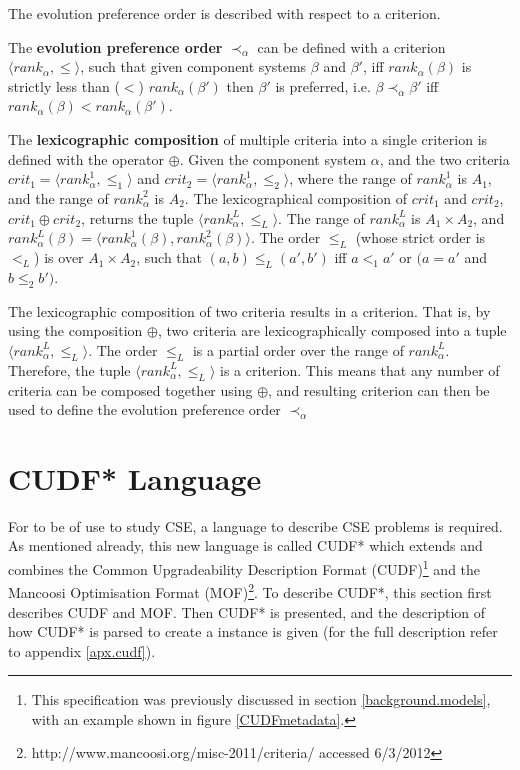 The evolution preference order is described with respect to a criterion.
\begin{defs}
\label{formal.defcrittooptimal}
The \textbf{evolution preference order} $\prec_{\alpha}$ can be defined with a criterion $\langle rank_{\alpha}, \leq \rangle$,
such that given component systems $\beta$ and $\beta'$, iff $rank_{\alpha}(\beta)$ is strictly less than ($<$) $rank_{\alpha}(\beta')$ then $\beta'$ is preferred, 
i.e. $\beta \prec_{\alpha} \beta'$ iff $rank_{\alpha}(\beta) < rank_{\alpha}(\beta')$.
\end{defs}


\begin{defs}
\label{formal.defcritlex}
The \textbf{lexicographic composition} of multiple criteria into a single criterion is defined with the operator $\oplus$.
Given the component system $\alpha$, and the two criteria $crit_1 = \langle rank^1_{\alpha}, \leq_{1} \rangle$ and $crit_2 = \langle rank^1_{\alpha}, \leq_{2} \rangle$,
where the range of $rank^1_{\alpha}$ is $A_1$, and the range of $rank^2_{\alpha}$ is $A_2$.
The lexicographical composition of $crit_1$ and $crit_2$, $crit_1 \oplus crit_2$, returns the tuple $\langle rank^L_{\alpha},\leq_L \rangle$.
The range of $rank^L_{\alpha}$ is $A_1 \times A_2$, and $rank^L_{\alpha}(\beta) = \langle rank^1_{\alpha}(\beta),rank^2_{\alpha}(\beta) \rangle$.
The order $\leq_L$ (whose strict order is $<_L$) is over $A_1 \times A_2$, such that $(a,b) \leq_L (a',b')$ iff $a <_1 a'$ or $(a = a'$ and $b \leq_2 b')$.
\end{defs}

The lexicographic composition of two criteria results in a criterion.
That is, by using the composition $\oplus$, two criteria are lexicographically composed into a tuple $\langle rank^L_{\alpha},\leq_L \rangle$.
The order $\leq_L$ is a partial order over the range of $rank^L_{\alpha}$.
Therefore, the tuple  $\langle rank^L_{\alpha},\leq_L \rangle$ is a criterion.
This means that any number of criteria can be composed together using $\oplus$,
and resulting criterion can then be used to define the evolution preference order $\prec_{\alpha}$


\section{CUDF* Language}
\label{formal.cudf}
For \modelname to be of use to study CSE, a language to describe CSE problems is required.
As mentioned already, this new language is called CUDF* which extends and combines the Common Upgradeability Description Format (CUDF)\footnote{This specification was previously discussed in section \ref{background.models}, with an example shown in figure \ref{CUDFmetadata}.
}
\citep{treinen2009common} and the Mancoosi Optimisation Format (MOF)\footnote{http://www.mancoosi.org/misc-2011/criteria/ accessed 6/3/2012}.
To describe CUDF*, this section first describes CUDF and MOF.
Then CUDF* is presented, and the description of how CUDF* is parsed to create a \modelname instance is given (for the full description refer to appendix \ref{apx.cudf}).

